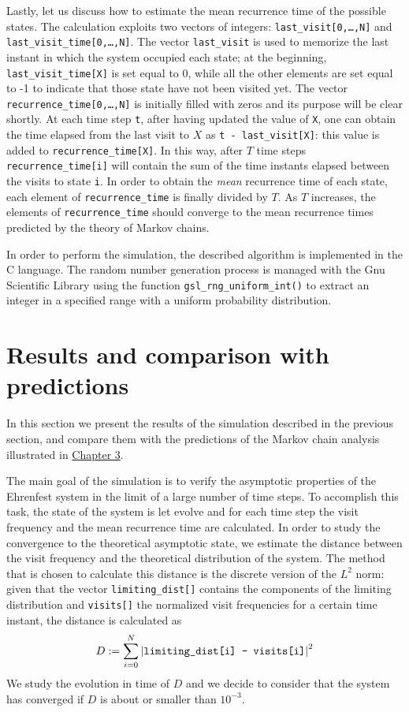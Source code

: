 \smallskip
Lastly, let us discuss how to estimate the mean recurrence time of the possible states. The calculation exploits two vectors of integers: \texttt{last\_visit[0,\dots,N]} and \texttt{last\_visit\_time[0,\dots,N]}. The vector \texttt{last\_visit} is used to memorize the last instant in which the system occupied each state; at the beginning, \texttt{last\_visit\_time[X]} is set equal to 0, while all the other elements are set equal to -1 to indicate that those state have not been visited yet. The vector \texttt{recurrence\_time[0,\dots,N]} is initially filled with zeros and its purpose will be clear shortly. At each time step \texttt{t}, after having updated the value of \texttt{X}, one can obtain the time elapsed from the last visit to $X$ as \texttt{t - last\_visit[X]}: this value is added to \texttt{recurrence\_time[X]}. In this way, after $T$ time steps \texttt{recurrence\_time[i]} will contain the sum of the time instants elapsed between the visits to state \texttt{i}. In order to obtain the \emph{mean} recurrence time of each state, each element of \texttt{recurrence\_time} is finally divided by $T$. As $T$ increases, the elements of \texttt{recurrence\_time} should converge to the mean recurrence times predicted by the theory of Markov chains.

\medskip
In order to perform the simulation, the described algorithm is implemented in the C language. The random number generation process is managed with the Gnu Scientific Library using the function \texttt{gsl\_rng\_uniform\_int()} to extract an integer in a specified range with a uniform probability distribution.

\section{Results and comparison with predictions}
In this section we present the results of the simulation described in the previous section, and compare them with the predictions of the Markov chain analysis illustrated in \hyperref[ch:3]{Chapter 3}.

The main goal of the simulation is to verify the asymptotic properties of the Ehrenfest system in the limit of a large number of time steps. To accomplish this task, the state of the system is let evolve and for each time step the visit frequency and the mean recurrence time are calculated. In order to study the convergence to the theoretical asymptotic state, we estimate the distance between the visit frequency and the theoretical distribution of the system. The method that is chosen to calculate this distance is the discrete version of the $L^2$ norm: given that the vector \texttt{limiting\_dist[]} contains the components of the limiting distribution and \texttt{visits[]} the normalized visit frequencies for a certain time instant, the distance is calculated as
\begin{equation} \label{eq:distance}
    D := \sum_{i = 0}^{N} \left|\text{\texttt{limiting\_dist[i] - visits[i]}} \right| ^2
\end{equation}
We study the evolution in time of $D$ and we decide to consider that the system has converged if $D$ is about or smaller than $10^{-3}$.

